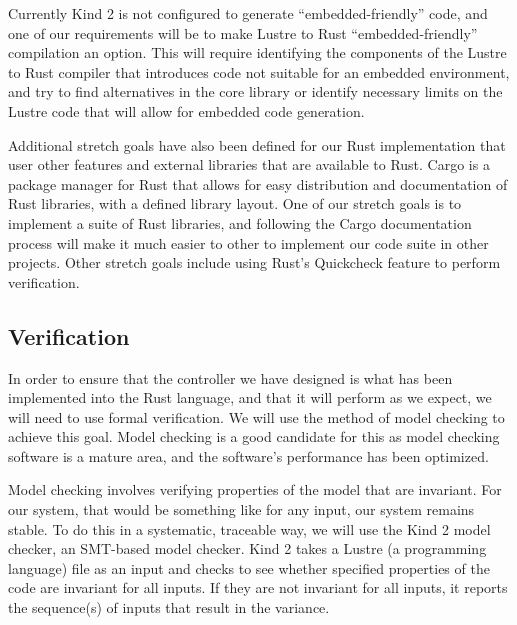 \documentclass[a4paper,12pt]{article}
\begin{document}
Currently Kind 2 is not configured to generate “embedded-friendly” code, and one of our requirements will be to make Lustre to Rust “embedded-friendly” compilation an option.  This will require identifying the components of the Lustre to Rust compiler that introduces code not suitable for an embedded environment, and try to find alternatives in the core library or identify necessary limits on the Lustre code that will allow for embedded code generation. \par

Additional stretch goals have also been defined for our Rust implementation that user other features and external libraries that are available to Rust.  Cargo is a package manager for Rust that allows for easy distribution and documentation of Rust libraries, with a defined library layout.  One of our stretch goals is to implement a suite of Rust libraries, and following the Cargo documentation process will make it much easier to other to implement our code suite in other projects.
Other stretch goals include using Rust's Quickcheck feature to perform verification.
\subsection{Verification}
In order to ensure that the controller we have designed is what has been implemented into the Rust language, and that it will perform as we expect, we will need to use formal verification. We will use the method of model checking to achieve this goal. Model checking is a good candidate for this as model checking software is a mature area, and the software’s performance has been optimized.\cite{baier} \par
Model checking involves verifying properties of the model that are invariant. For our system, that would be something like for any input, our system remains stable. To do this in a systematic, traceable way, we will use the Kind 2 model checker, an SMT-based model checker. Kind 2 takes a Lustre (a programming language) file as an input and checks to see whether specified properties of the code are invariant for all inputs. If they are not invariant for all inputs, it reports the sequence(s) of inputs that result in the variance. \par
\end{document}

